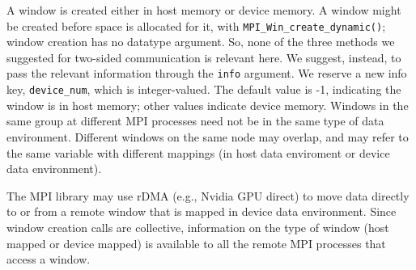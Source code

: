\documentclass[twoside,11pt]{article}
\begin{document}
A window is created either in host memory or device memory. A window might be 
created before space is allocated for it, with 
\texttt{MPI\_Win\_create\_dynamic()}; window creation has no datatype argument. 
So, none of the three methods we suggested for two-sided communication is 
relevant here. We suggest, instead, to pass the relevant information through 
the \texttt{info} argument. We reserve a new info key, \texttt{device\_num}, 
which is integer-valued. The default value is -1, indicating the window is in 
host memory; other values indicate device memory. Windows in the same group at 
different MPI processes need not be in the same type of data environment. 
Different windows on the same node may overlap, and may refer to the same 
variable with different mappings (in host data enviroment or device data 
environment).

The MPI library may use rDMA (e.g., Nvidia GPU direct) to move data directly to 
or from a remote window that is mapped in device data environment. Since window 
creation calls are collective, information on the type of window (host mapped 
or device mapped) is available to all the remote MPI processes that access a 
window.

	
\end{document}
